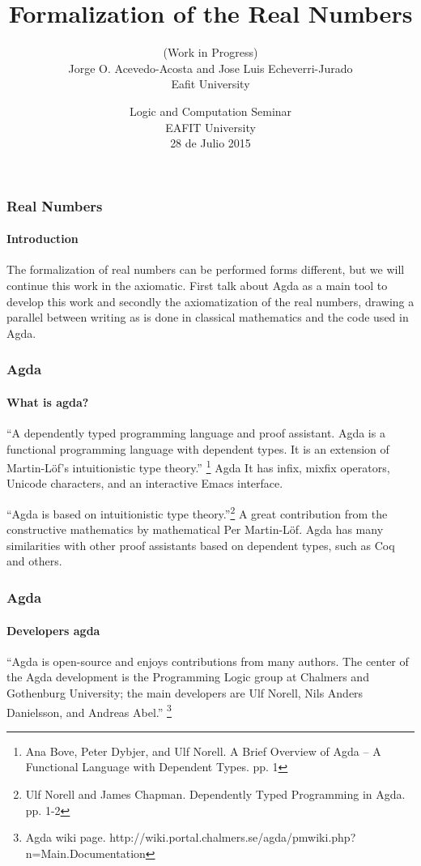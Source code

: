\documentclass{beamer}
\title{Formalization of the Real Numbers}
\author{{{ \rm { \rm (Work in Progress)} \\ {Jorge O. Acevedo-Acosta and Jose Luis Echeverri-Jurado}}}  \\
\;\;\;\;\; {{ \rm Eafit University}}}
\date{{{ \rm Logic and Computation Seminar}} \\ {{ \rm EAFIT University}} \\ {{ \rm 28 de Julio 2015}}}
\begin{document}
\justifying
\begin{frame}
\titlepage
\end{frame}

\begin{frame}
\frametitle{Real Numbers} \framesubtitle{Introduction}
 { \rm The
  formalization of real numbers can be performed forms different, but
  we will continue this work in the axiomatic. First talk about Agda
  as a main tool to develop this work and secondly the axiomatization
  of the real numbers, drawing a parallel between writing as is done
  in classical mathematics and the code used in Agda.}
\end{frame}

\begin{frame}
\frametitle{Agda} \framesubtitle{What is agda?}
{ \rm ``A dependently
  typed programming language and proof assistant. Agda is a functional
  programming language with dependent types. It is an extension of
  Martin-L\"of’s intuitionistic type theory.'' \footnote{{{ \tiny \rm Ana
      Bove, Peter Dybjer, and Ulf Norell. A Brief Overview of Agda –
A Functional Language with Dependent Types. pp. 1}}} Agda It has infix,
mixfix operators, Unicode characters, and an interactive Emacs
interface.\\}\;\;\;\;

{ \rm ``Agda is based on intuitionistic type theory.''\footnote{{{ \tiny \rm
      Ulf Norell and James Chapman. Dependently Typed Programming in
      Agda. pp. 1-2}}} A great contribution from the constructive
  mathematics by mathematical Per Martin-L\"of. Agda has many
  similarities with other proof assistants based on dependent types,
  such as Coq and others.}
\end{frame}

\begin{frame}
\frametitle{Agda} \framesubtitle{Developers agda}
{ \rm ``Agda is
  open-source and enjoys contributions from many authors. The center
  of the Agda development is the Programming Logic group at Chalmers
  and Gothenburg University; the main developers are Ulf Norell, Nils
  Anders Danielsson, and Andreas Abel.'' \footnote{{{ \tiny \rm Agda wiki
      page. http://wiki.portal.chalmers.se/agda/pmwiki.php?n=Main.Documentation
}}}}
\end{frame}
\end{document}
